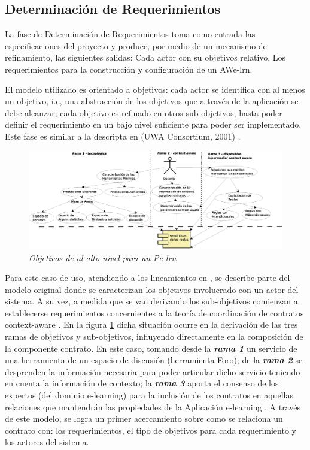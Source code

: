 \subsection{Determinación de Requerimientos} \label{sdr}

La fase de Determinación de Requerimientos toma como entrada las
especificaciones del proyecto y produce, por medio de un mecanismo de
refinamiento, las siguientes salidas: Cada actor con su objetivos relativo. Los
requerimientos para la construcción y configuración de un AWe-lrn.
 
El modelo utilizado es orientado a objetivos: cada actor se identifica con al
menos un objetivo, i.e, una abstracción de los objetivos que a través de la
aplicación se debe alcanzar; cada objetivo es refinado en otros sub-objetivos,
hasta poder definir el requerimiento en un bajo nivel suficiente para poder ser
implementado. Este fase es similar a la descripta en (UWA Consortium, 2001)
\cite{UWA}. 

	\begin{figure}[!h]
        	\begin{center}
		\includegraphics[width= 5 in,totalheight=3
in]{Requerimientos.eps}
                \caption{\small \sl Objetivos de al alto nivel para un Pe-lrn}
\label{requerimientos}
         	\end{center}
         \end{figure}

Para este caso de uso, atendiendo a los lineamientos en \cite{libro}, se
describe parte del modelo original donde se caracterizan los objetivos
involucrado con un actor del sistema. A su vez, a medida que se van derivando
los sub-objetivos comienzan a establecerse requerimientos concernientes a la
teoría de coordinación de contratos context-aware \cite{libro5,fiadeiro}. En la
figura \ref{requerimientos} dicha situación ocurre en la derivación de las tres
ramas de objetivos y sub-objetivos, influyendo directamente en la composición de
la componente contrato. En este caso, tomando desde la \textit{\textbf{rama 1}}
un servicio de una herramienta de un espacio de discusión (herramienta Foro); de
la \textit{\textbf{rama 2}} se desprenden la información necesaria para poder
articular dicho servicio teniendo en cuenta la información de contexto;  la
\textit{\textbf{rama 3}} aporta el consenso de los expertos (del dominio
e-learning) para la inclusión de los contratos en aquellas relaciones que
mantendrán las propiedades de la Aplicación e-learning \cite{libro5}. A través
de este modelo, se logra un primer acercamiento sobre como se relaciona un
contrato con: los requerimientos, el tipo de objetivos para cada requerimiento y
los actores del sistema. 

